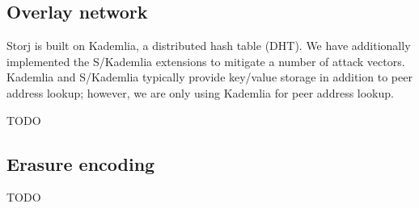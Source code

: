 \documentclass[a4paper,10pt]{article}
\newcommand{\todo}[1]{{\color{red} TODO #1}}
\begin{document}
\subsection{Overlay network}

Storj is built on Kademlia\cite{kademlia}, a distributed hash table (DHT).
We have additionally implemented the S/Kademlia\cite{s-kademlia} extensions to
mitigate a number of attack vectors. Kademlia and S/Kademlia typically provide
key/value storage in addition to peer address lookup; however, we are
only using Kademlia for peer address lookup.

\todo{}

\subsection{Erasure encoding}

\todo{}
\end{document}
